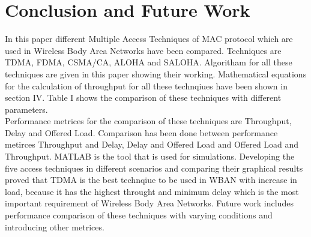 \documentclass[11pt, conference, compsocconf, onecolumn]{IEEEtran}
\begin{document}
\section{Conclusion and Future Work}
In this paper different Multiple Access Techniques of MAC protocol which are used in Wireless Body Area Networks have been compared. Techniques are
TDMA, FDMA, CSMA/CA, ALOHA and SALOHA. Algoritham for all these techniques are given in this paper showing their working. Mathematical equations for the calculation
of throughput for all these technqiues have been shown in section IV. Table I shows the comparison of these techniques with different parameters. \\
\indent Performance metrices for the comparison of these techniques are Throughput, Delay and Offered Load. Comparison has been done between performance metirces Throughput and Delay, Delay and Offered Load and Offered Load and Throughput. MATLAB is the tool that is used for simulations. Developing the five access techniques in different scenarios and comparing their graphical results proved that TDMA is the best technqiue to be used in WBAN with increase in load, because it has the highest throught and minimum delay which is the most important requirement of Wireless Body Area Networks. Future work includes performance comparison of these techniques with varying conditions and introducing other metrices.
\end{document}
